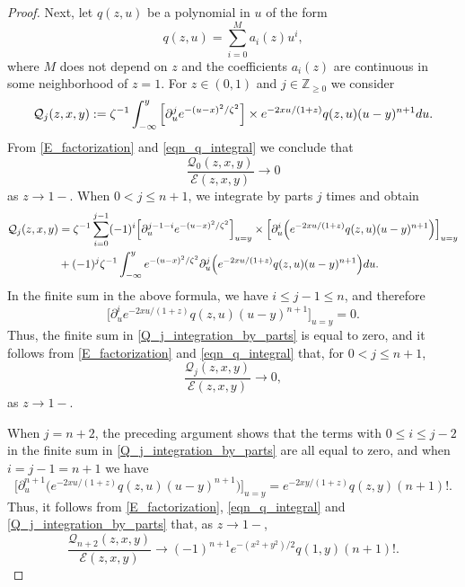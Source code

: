 \documentclass[10pt,a4paper]{amsart}
\def\E{{\mathcal E}}
\def\d{{\textnormal d}}
\begin{document}
\begin{proof}
Next, let $q(z,u)$ be a polynomial in $u$ of the form
\begin{equation}\label{form_of_q}
q(z,u)=\sum\limits_{i=0}^M a_i(z) u^i,
\end{equation}
where $M$ does not depend on $z$ and the coefficients $a_i(z)$ are continuous in some neighborhood of $z=1$. For $z\in (0,1)$ and $j \in {\mathbb Z}_{\geqslant 0}$ we consider 
\begin{equation}\label{def_Q_j}
{\mathcal Q}_{j}(z,x,y):=\zeta^{-1} \int_{-\infty}^y \Big[\partial_u^j  
e^{-(u-x)^2/\zeta^2} \Big] \times  e^{-2xu/(1+z)} q(z,u) (u-y)^{n+1} \d u. 
\end{equation}
From \eqref{E_factorization} and \eqref{eqn_q_integral} we conclude that 
\begin{equation*}
\frac{{\mathcal Q}_{0}(z,x,y)}{\E(z,x,y)} \to 0
\end{equation*}
as $z \to 1-$. When $0< j \leqslant n+1$, we 
integrate by parts $j$ times 
and obtain 
\begin{align}\label{Q_j_integration_by_parts}
{\mathcal Q}_j(z,x,y)&= 
\zeta^{-1} \sum\limits_{i=0}^{j-1} (-1)^i \Big[\partial_u^{j-1-i}  
e^{-(u-x)^2/\zeta^2} \Big]_{u=y} \times 
\Big[\partial_u^i \Big(  
e^{-2xu/(1+z)} q(z,u) (u-y)^{n+1}\Big)\Big]_{u=y} 
\\\nonumber &+(-1)^j \zeta^{-1} \int_{-\infty}^y 
e^{-(u-x)^2/\zeta^2} 
\partial_u^j  \Big(
e^{-2xu/(1+z)} q(z,u) (u-y)^{n+1}\Big) \d u.
\end{align}
In the finite sum in the above formula, we have $i\leqslant j-1 \leqslant n$, and therefore
\[
\Big[\partial_u^i  
e^{-2xu/(1+z)} q(z,u) (u-y)^{n+1}\Big]_{u=y}=0. 
\]
Thus, the finite sum in \eqref{Q_j_integration_by_parts} is equal to zero, and
it follows from \eqref{E_factorization} and \eqref{eqn_q_integral} that, for $0<j\leqslant n+1$,
\begin{equation*}
\frac{{\mathcal Q}_{j}(z,x,y)}{\E(z,x,y)} \to 0, 
\end{equation*}
as $z \to 1-$. 

When $j=n+2$, the preceding argument shows that  the terms with $0\leqslant i \leqslant j-2$ in the finite sum in \eqref{Q_j_integration_by_parts} are all equal to zero, and when $i=j-1=n+1$ we have
\[
\Big[\partial_u^{n+1} \Big(  
e^{-2xu/(1+z)} q(z,u) (u-y)^{n+1}\Big)\Big]_{u=y}= 
e^{-2xy/(1+z)} q(z,y) (n+1)!.
\]
Thus, it follows from 
\eqref{E_factorization}, \eqref{eqn_q_integral} and 
\eqref{Q_j_integration_by_parts} that, as $z\to 1-$,
\begin{equation*}
\frac{{\mathcal Q}_{n+2}(z,x,y)}{\E(z,x,y)} \to 
 (-1)^{n+1} 
 e^{-(x^2+y^2)/2} q(1,y) (n+1)!. 
\end{equation*}



\end{proof}
\end{document}
